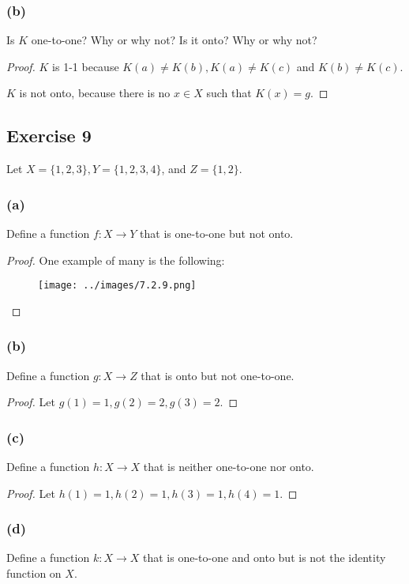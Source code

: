 \documentclass[14pt]{extarticle}
\begin{document}
\subsubsection{(b)}
Is $K$ one-to-one? Why or why not? Is it onto? Why or why not?

\begin{proof}
    $K$ is 1-1 because \(K(a) \neq K(b), K(a) \neq K(c)\) and \(K(b) \neq K(c)\).

    $K$ is not onto, because there is no $x \in X$ such that $K(x) = g$.
\end{proof}

\subsection{Exercise 9}
Let \(X = \{1, 2, 3\}, Y = \{1, 2, 3, 4\}\), and \(Z = \{1, 2\}\).

\subsubsection{(a)}
Define a function \(f: X \to Y\) that is one-to-one but not onto.

\begin{proof}
    One example of many is the following:
    \begin{figure}[ht!]
        \centering
        \texttt{[image: ../images/7.2.9.png]}
    \end{figure}
\end{proof}

\subsubsection{(b)}
Define a function \(g: X \to Z\) that is onto but not one-to-one.

\begin{proof}
    Let \(g(1) = 1, g(2) = 2, g(3) = 2\).
\end{proof}

\subsubsection{(c)}
Define a function \(h: X \to X\) that is neither one-to-one nor onto.

\begin{proof}
    Let \(h(1) = 1, h(2) = 1, h(3) = 1, h(4) = 1\).
\end{proof}

\subsubsection{(d)}
Define a function \(k: X \to X\) that is one-to-one and onto but is not the identity function on $X$.
\end{document}
